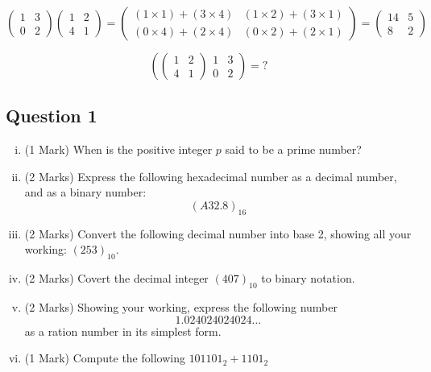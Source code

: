 \documentclass[]{report}
\begin{document}
\bigskip
\large{
	\[ \left(
	\begin{array}{cc}
	1 & 3 \\ 
	0 & 2
	\end{array} \right)\left(
	\begin{array}{cc}
	1 & 2 \\ 
	4 & 1
	\end{array} \right) = \left(
	\begin{array}{cc}
	(1 \times 1) + (3 \times 4) & (1 \times 2) + (3 \times 1) \\ 
	(0 \times 4) + (2 \times 4) & (0 \times 2) + (2 \times 1)
	\end{array} \right) = \left(
	\begin{array}{cc}
	14 & 5 \\ 
	8 & 2
	\end{array} \right) \]
}

\[ \left(
\left(
\begin{array}{cc}
1 & 2 \\ 
4 & 1
\end{array} \right)
\begin{array}{cc}
1 & 3 \\ 
0 & 2
\end{array} \right) = ? \]


\subsection*{Question 1}

\begin{enumerate}[(i)]
	\item (1 Mark) When is the positive integer $p$ said to be a prime number?
	\item (2 Marks) Express the following hexadecimal number as a decimal number, and as a binary number: \[(A32.8)_{16}\]
	
	\item (2 Marks) Convert the following decimal number into base 2, showing all your working:
	$(253)_{10}$. 
	\item (2 Marks) Covert the decimal integer $(407)_{10}$ to binary notation.
	
	\item (2 Marks) Showing your working, express the following number 
	\[ 1.024024024024\ldots\]
	as a ration number in its simplest form.
	\item (1 Mark) Compute the following $101101_2 + 1101_2$ 
\end{enumerate}
\end{document}
